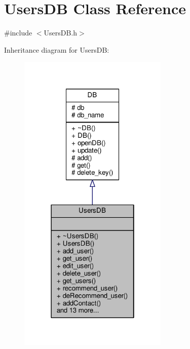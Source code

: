 \hypertarget{classUsersDB}{}\section{Users\+DB Class Reference}
\label{classUsersDB}


{\ttfamily \#include $<$Users\+D\+B.\+h$>$}



Inheritance diagram for Users\+DB\+:\nopagebreak
\begin{figure}[H]
\begin{center}
\leavevmode
\includegraphics[width=202pt]{df/d2a/classUsersDB__inherit__graph}
\end{center}
\end{figure}


